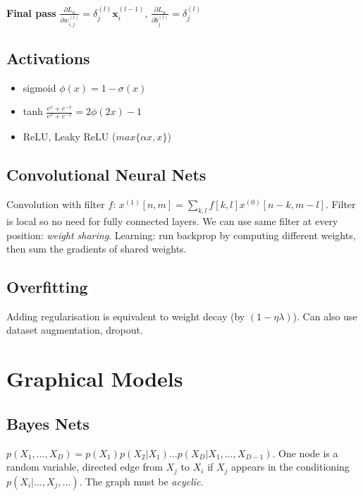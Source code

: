 \textbf{Final pass} \newline
$\frac{\partial{L}_n}{\partial w_{i,j}^{(l)}} = \delta^{(l)}_j \mathbf{x}_i^{(l-1)}$, $\frac{\partial{L}_n}{\partial b_{j}^{(l)}} = \delta_j^{(l)}$

\subsection{Activations}
\begin{itemize}
\item sigmoid $\phi(x) = 1 -\sigma(x)$
\item tanh $\frac{e^x+e^{-x}}{e^x+e^{-x}} = 2 \phi(2x)-1$
\item ReLU, Leaky ReLU ($max\{\alpha x, x\}$)
\end{itemize}

\subsection{Convolutional Neural Nets}
Convolution with filter $f$: $x^{(1)}[n,m] = \sum_{k,l} f[k,l]x^{(0)}[n-k, m-l]$. Filter is local so no need for fully connected layers. We can use same filter at every position: \textit{weight sharing}. Learning: run backprop by computing different weights, then sum the gradients of shared weights.

\subsection{Overfitting}
Adding regularisation is equivalent to weight decay (by $(1-\eta\lambda)$). Can also use dataset augmentation, dropout.


\section{Graphical Models}
\subsection{Bayes Nets}
$p(X_1,\dots,X_D) = p(X_1)p(X_2|X_1)\dots p(X_D|X_1,\dots,X_{D-1})$. One node is a random variable, directed edge from $X_j$ to $X_i$ if $X_j$ appears in the conditioning $p(X_i|\dots,X_j,\dots)$. The graph must be \textit{acyclic}.

